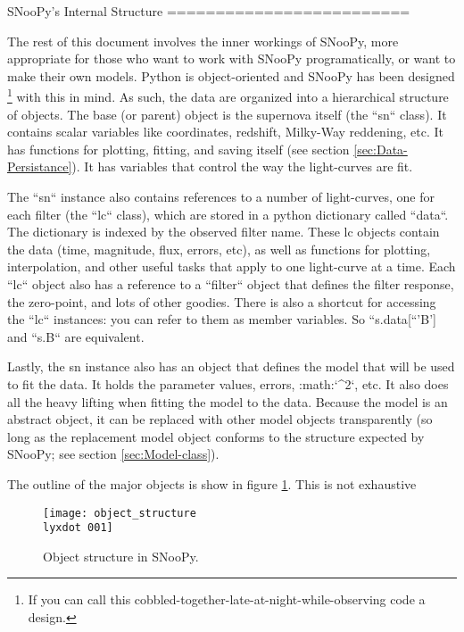 SNooPy's Internal Structure
=========================

The rest of this document involves the inner workings of SNooPy, more
appropriate for those who want to work with SNooPy programatically,
or want to make their own models. Python is object-oriented and SNooPy
has been designed%
\footnote{If you can call this cobbled-together-late-at-night-while-observing
code a design.%
} with this in mind. As such, the data are organized into a hierarchical
structure of objects. The base (or parent) object is the supernova
itself (the ``sn`` class). It contains scalar variables like
coordinates, redshift, Milky-Way reddening, etc. It has functions
for plotting, fitting, and saving itself (see section \ref{sec:Data-Persistance}).
It has variables that control the way the light-curves are fit. 

The ``sn`` instance also contains references to a number of light-curves,
one for each filter (the ``lc`` class), which are stored in a
python dictionary called ``data``. The dictionary is indexed
by the observed filter name. These lc objects contain the data (time,
magnitude, flux, errors, etc), as well as functions for plotting,
interpolation, and other useful tasks that apply to one light-curve
at a time. Each ``lc`` object also has a reference to a ``filter``
object that defines the filter response, the zero-point, and lots
of other goodies. There is also a shortcut for accessing the ``lc``
instances: you can refer to them as member variables. So ``s.data{[``'B'{]}}
and ``s.B`` are equivalent.

Lastly, the sn instance also has an object that defines the model
that will be used to fit the data. It holds the parameter values,
errors, :math:`\chi^{2}`, etc. It also does all the heavy lifting when
fitting the model to the data. Because the model is an abstract object,
it can be replaced with other model objects transparently (so long
as the replacement model object conforms to the structure expected
by SNooPy; see section \ref{sec:Model-class}).

The outline of the major objects is show in figure \ref{fig:Object-structure}.
This is not exhaustive

\begin{figure}
\texttt{[image: object\_structure\\lyxdot 001]}

\caption{Object structure in SNooPy.\label{fig:Object-structure}}
\end{figure}



